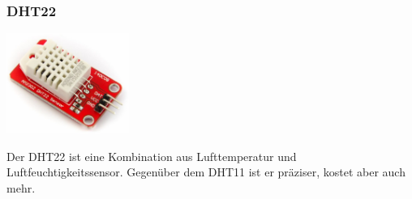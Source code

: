 \documentclass[
  12pt, %
  a4paper, %
  oneside, %
  openany, 
  numbers=noenddot, %
  BCOR=5mm, %
  parskip=half*, %
  thesis, %
]{bfhbook}
\newcommand{\compImgSize}{4cm}
\begin{document}
 \subsubsection{DHT22}\label{DHT22}
\begin{minipage}[t]{0.5\linewidth}
		\centering
    		\includegraphics[width=\compImgSize, left, valign=t]{Bilder/DHT22.jpg}
    		 \captionsetup{justification=raggedright}
	\end{minipage}
	\begin{minipage}[t]{0.5\linewidth}
	Der DHT22 \footnotemark ist eine Kombination aus Lufttemperatur und Luftfeuchtigkeitssensor. Gegenüber dem DHT11 ist er präziser, kostet aber auch mehr.
\end{minipage}
\end{document}
